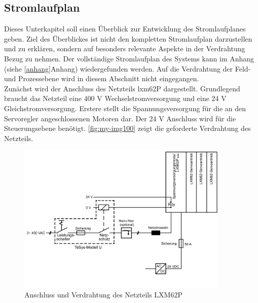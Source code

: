 \documentclass[../../../Bachelorarbeit.tex]{subfiles}
\begin{document}
\subsection{Stromlaufplan} \label{Stromlaufplan}
Dieses Unterkapitel soll einen Überblick zur Entwicklung des Stromlaufplanes geben. Ziel des Überblickes ist nicht den kompletten Stromlaufplan darzustellen und zu erklären, sondern auf besonders relevante Aspekte in der Verdrahtung Bezug zu nehmen. Der vollständige Stromlaufplan des Systems kann im Anhang (siehe \autoref{anhang}Anhang) wiedergefunden werden. Auf die Verdrahtung der Feld- und Prozessebene wird in diesem Abschnitt nicht eingegangen.\\
Zunächst wird der Anschluss des Netzteils \acs{lxm}62P dargestellt. Grundlegend braucht das Netzteil eine 400 \si{V} Wechselstromversorgung und eine 24 \si{V} Gleichstromversorgung. Erstere stellt die Spannungsversorgung für die an den Servoregler angeschlossenen Motoren dar. Der 24 \si{V} Anschluss wird für die Steuerungsebene benötigt. \autoref{fig:my-img100} zeigt die geforderte Verdrahtung des Netzteils. 

\begin{figure}[H]
    \centering
    \includegraphics[width=0.9\textwidth]{Images/netzteil_verdrahtung.png}
    \caption[Netzteilverdrahtung]{Anschluss und Verdrahtung des Netzteils LXM62P}
    \label{fig:my-img100}
\end{figure}
\end{document}
